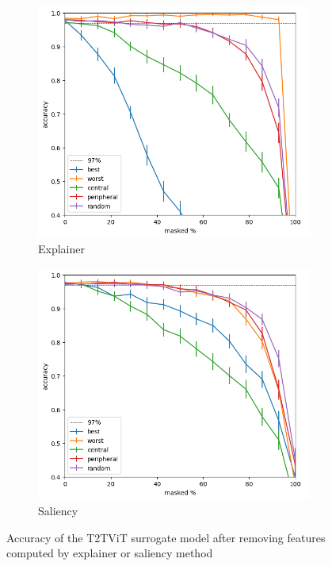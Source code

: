 \documentclass[magisterska,en]{pracamgr}
\begin{document}
\begin{figure}
\centering
\begin{subfigure}{.6\textwidth}
  \centering
  \includegraphics[width=.6\linewidth]{./images/masking_explainer_patches_accuracy_t2t_vit_half-0.png}
  \caption{Explainer}
  \label{fig:sub1}
\end{subfigure}%
\begin{subfigure}{.6\textwidth}
  \centering
  \includegraphics[width=.6\linewidth]
{./images/masking_saliency_patches_accuracy_t2t_vit_half-0.png}
  \caption{Saliency}
  \label{fig:sub2}
\end{subfigure}
\caption{Accuracy of the T2T\textunderscore ViT surrogate model after removing features computed by explainer or saliency method}
\label{fig:T2T_ViT_Saliency_Explainer_CIFAR}
\end{figure}
\end{document}
